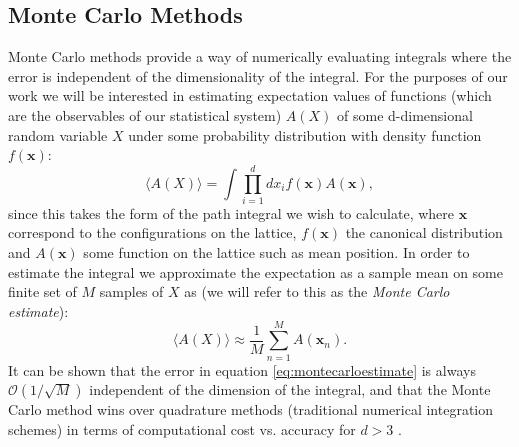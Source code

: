 \documentclass[12pt]{article}
\begin{document}
    \subsection{Monte Carlo Methods}
    Monte Carlo methods provide a way of numerically evaluating integrals where the error is independent of the dimensionality of the integral. For the purposes of our work we will be interested in estimating expectation values of functions (which are the observables of our statistical system) $A\left(X\right)$ of some d-dimensional random variable $X$ under some probability distribution with density function $f\left(\bm{x}\right)$:
    \begin{equation}
        \label{eq:expectation}
        \langle A\left(X\right) \rangle = \int \prod_{i=1}^{d}{dx_i}f\left(\bm{x}\right)A\left(\bm{x}\right),
    \end{equation}
    since this takes the form of the path integral we wish to calculate, where $\bm{x}$ correspond to the configurations on the lattice, $f\left(\bm{x}\right)$ the canonical distribution and $A\left(\bm{x}\right)$ some function on the lattice such as mean position. In order to estimate the integral we approximate the expectation as a sample mean on some finite set of $M$ samples of $X$ as (we will refer to this as the \textit{Monte Carlo estimate}):
    \begin{equation}
        \label{eq:montecarloestimate}
        \langle A\left(X\right)\rangle \approx \frac{1}{M} \sum_{n=1}^{M}A\left(\bm{x}_n\right).
    \end{equation}
    It can be shown that the error in equation \ref{eq:montecarloestimate} is always $\mathcal{O}\left(1/\sqrt{M}\right)$ independent of the dimension of the integral, and that the Monte Carlo method wins over quadrature methods (traditional numerical integration schemes) in terms of computational cost vs. accuracy for $d>3$ \cite{gattringer_lang_2013}.
\end{document}
